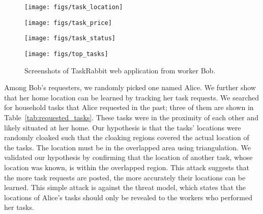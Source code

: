 \documentclass{USC-Thesis}
\numberwithin{equation}{chapter}
\begin{document}
\begin{figure*}[ht]
	\begin{minipage}[b]{.245\linewidth}
		\centering
		\texttt{[image: figs/task\_location]}
		\label{fig:task_location}
	\end{minipage}
		\begin{minipage}[b]{.245\linewidth}
		\centering
		\texttt{[image: figs/task\_price]}
		\label{fig:task_price}
	\end{minipage}
	\begin{minipage}[b]{.245\linewidth}
		\centering
		\texttt{[image: figs/task\_status]}
		\label{fig:task_status}
	\end{minipage}
	\begin{minipage}[b]{.245\linewidth}
		\centering
		\texttt{[image: figs/top\_tasks]}
		\label{fig:top_tasks}
	\end{minipage}
	\caption{Screenshots of TaskRabbit web application from worker Bob.}
	\label{fig:task_info}
\end{figure*}

Among Bob's requesters, we randomly picked one named Alice.
We further show that her home location can be learned by tracking her task requests.
We searched for household tasks that Alice requested in the past; three of them are shown in Table~\ref{tab:requested_tasks}. These tasks were in the proximity of each other and likely situated at her home. Our hypothesis is that the tasks' locations were randomly cloaked such that the cloaking regions covered the actual location of the tasks.
The location must be in the overlapped area using triangulation. We validated our hypothesis by confirming that the location of another task, whose location was known, is within the overlapped region. This attack suggests that the more task requests are posted, the more accurately their locations can be learned. This simple attack is against the threat model, which states that the locations of Alice's tasks should only be revealed to the workers who performed her tasks.
\end{document}
